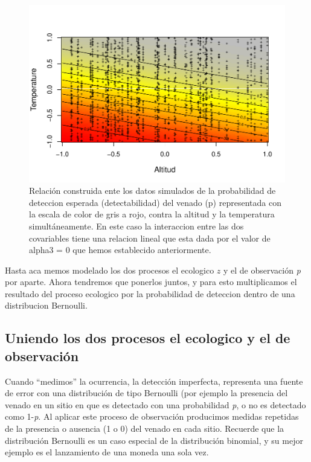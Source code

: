 \documentclass[]{book}
\begin{document}
\begin{figure}[htbp]
\centering
\includegraphics{Simul-Machalilla-book_files/figure-latex/graph5-1.pdf}
\caption{\label{fig:graph5}Relación construida ente los datos simulados de
la probabilidad de deteccion esperada (detectabilidad) del venado (p)
representada con la escala de color de gris a rojo, contra la altitud y
la temperatura simultáneamente. En este caso la interaccion entre las
dos covariables tiene una relacion lineal que esta dada por el valor de
alpha3 = 0 que hemos establecido anteriormente.}
\end{figure}

Hasta aca memos modelado los dos procesos el ecologico \(z\) y el de
observación \emph{p} por aparte. Ahora tendremos que ponerlos juntos, y
para esto multiplicamos el resultado del proceso ecologico por la
probabilidad de deteccion dentro de una distribucion Bernoulli.

\subsection{Uniendo los dos procesos el ecologico y el de
observación}\label{uniendo-los-dos-procesos-el-ecologico-y-el-de-observacion}

Cuando ``medimos'' la ocurrencia, la detección imperfecta, representa
una fuente de error con una distribución de tipo Bernoulli (por ejemplo
la presencia del venado en un sitio en que es detectado con una
probabilidad \emph{p}, o no es detectado como 1-\emph{p}. Al aplicar
este proceso de observación producimos medidas repetidas de la presencia
o ausencia (1 o 0) del venado en cada sitio. Recuerde que la
distribución Bernoulli es un caso especial de la distribución binomial,
y su mejor ejemplo es el lanzamiento de una moneda una sola vez.
\end{document}
